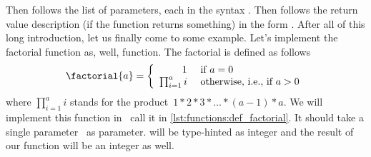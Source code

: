 Then follows the list of parameters, each in the syntax .
Then follows the return value description (if the function returns something) in the form .%
%
%
%
%
%
%
%
After all of this long introduction, let us finally come to some example.
Let's implement the factorial function as, well, function.
The factorial is defined as follows~\cite{D1991TEHOTFF,CB2022FBDOTFF}%
%
\begin{equation}%
\factorial{a}=\left\{\begin{array}{rl}%
1&\textnormal{~if~}a = 0\\%
\prod_{i=1}^a i&\textnormal{~otherwise, i.e., if~}a>0%
\end{array}\right.%
\label{eq:factorial}%
\end{equation}%
%
where $\prod_{i=1}^a i$ stands for the product~$1*2*3*\dots*(a-1)*a$.
We will implement this function in \python\ call it  in \cref{lst:functions:def_factorial}.
It should take a single parameter~ as parameter.
 will be type-hinted as integer and the result of our function will be an integer as well.

